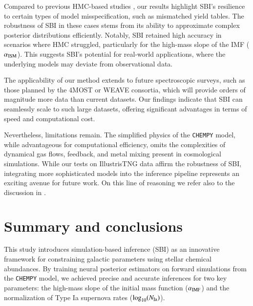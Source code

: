 \documentclass{aa}
\begin{document}
Compared to previous HMC-based studies \citep[e.g.][]{Philcox_2019}, our results highlight SBI's resilience to certain types of model misspecification, such as mismatched yield tables. The robustness of SBI in these cases stems from its ability to approximate complex posterior distributions efficiently. Notably, SBI retained high accuracy in scenarios where HMC struggled, particularly for the high-mass slope of the IMF ($\alpha_{\rm ISM}$). This suggests SBI's potential for real-world applications, where the underlying models may deviate from observational data.

The applicability of our method extends to future spectroscopic surveys, such as those planned by the 4MOST or WEAVE consortia, which will provide orders of magnitude more data than current datasets. Our findings indicate that SBI can seamlessly scale to such large datasets, offering significant advantages in terms of speed and computational cost.

Nevertheless, limitations remain. The simplified physics of the \texttt{CHEMPY} model, while advantageous for computational efficiency, omits the complexities of dynamical gas flows, feedback, and metal mixing present in cosmological simulations. While our tests on IllustrisTNG data affirm the robustness of SBI, integrating more sophisticated models into the inference pipeline represents an exciting avenue for future work. On this line of reasoning we refer also to the discussion in \citet{Philcox_2019}.

\section{Summary and conclusions}
\label{sec: conclusion}

This study introduces simulation-based inference (SBI) as an innovative framework for constraining galactic parameters using stellar chemical abundances. By training neural posterior estimators on forward simulations from the \texttt{CHEMPY} model, we achieved precise and accurate inferences for two key parameters: the high-mass slope of the initial mass function ($\alpha_{\rm IMF}$) and the normalization of Type Ia supernova rates ($\log_{10}(N_{\rm Ia})$).
\end{document}
